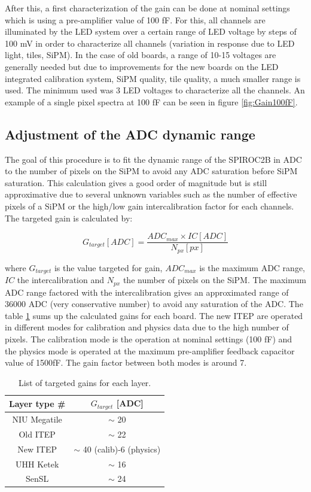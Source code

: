 After this, a first characterization of the gain can be done at nominal settings which is using a pre-amplifier value of 100 fF. For this, all channels are illuminated by the LED system over a certain range of LED voltage by steps of 100 mV in order to characterize all channels (variation in response due to LED light, tiles, SiPM). In the case of old boards, a range of 10-15 voltages are generally needed but due to improvements for the new boards on the LED integrated calibration system, SiPM quality, tile quality, a much smaller range is used. The minimum used was 3 LED voltages to characterize all the channels. An example of a single pixel spectra at 100 fF can be seen in figure \ref{fig:Gain100fF}.

\subsection{Adjustment of the ADC dynamic range}

The goal of this procedure is to fit the dynamic range of the SPIROC2B in ADC to the number of pixels on the SiPM to avoid any ADC saturation before SiPM saturation. This calculation gives a good order of magnitude but is still approximative due to several unknown variables such as the number of effective pixels of a SiPM or the high/low gain intercalibration factor for each channels. The targeted gain is calculated by:

\begin{equation}
  G_{target} [ADC] = \frac{ADC_{max} \times IC [ADC]}{N_{px} [px]}
\end{equation}

where $G_{target}$ is the value targeted for gain, $ADC_{max}$ is the maximum ADC range, $IC$ the intercalibration and $N_{px}$ the number of pixels on the SiPM. The maximum ADC range factored with the intercalibration gives an approximated range of 36000 ADC (very conservative number) to avoid any saturation of the ADC. The table \ref{table:GainTarget_SiPM} sums up the calculated gains for each board. The new ITEP are operated in different modes for calibration and physics data due to the high number of pixels. The calibration mode is the operation at nominal settings (100 fF) and the physics mode is operated at the maximum pre-amplifier feedback capacitor value of 1500fF. The gain factor between both modes is around 7.

\begin{table}[htb!]
  \centering
  \caption{List of targeted gains for each layer.}
  \label{table:GainTarget_SiPM}
  \begin{tabular}{@{} cc @{}}
    \hline
    Layer type \# & $G_{target}$ [ADC] \\
    \hline
    NIU Megatile & $\sim$ 20\\
    Old ITEP & $\sim$ 22\\
    New ITEP & $\sim$ 40 (calib)-6 (physics)\\
    UHH Ketek & $\sim$ 16\\
    SenSL & $\sim$ 24\\
    \hline
  \end{tabular}
\end{table}

